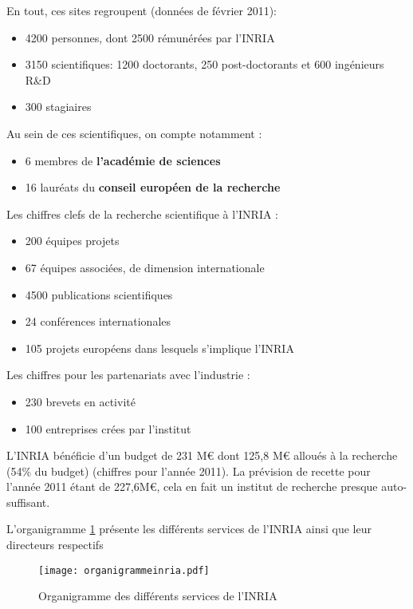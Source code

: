 \documentclass[a4paper, 11pt]{report}
\begin{document}
    En tout, ces sites regroupent (données de février 2011):
    \begin{itemize}
      \item 4200 personnes, dont 2500 rémunérées par l'INRIA
      \item 3150 scientifiques: 1200 doctorants, 250 post-doctorants et 600
        ingénieurs R\&D
      \item 300 stagiaires
    \end{itemize}
    Au sein de ces scientifiques, on compte notamment :
    \begin{itemize}
      \item 6 membres de \textbf{l'académie de sciences}
      \item 16 lauréats du \textbf{conseil européen de la recherche}
    \end{itemize}

    Les chiffres clefs de la recherche scientifique à l'INRIA :
    \begin{itemize}
      \item 200 équipes projets
      \item 67 équipes associées, de dimension internationale
      \item 4500 publications scientifiques
      \item 24 conférences internationales
      \item 105 projets européens dans lesquels s'implique l'INRIA
    \end{itemize}

    Les chiffres pour les partenariats avec l'industrie :
    \begin{itemize}
      \item 230 brevets en activité
      \item 100 entreprises crées par l'institut
    \end{itemize}

    L'INRIA bénéficie d'un budget de 231 M\euro{} dont 125,8 M\euro{} alloués à la
    recherche (54\% du budget) (chiffres pour l'année 2011). La prévision
    de recette pour l'année 2011 étant de 227,6M\euro{}, cela en fait un institut
    de recherche presque auto-suffisant.

    L'organigramme \ref{orga} présente les différents services de l'INRIA ainsi
    que leur directeurs respectifs
    \begin{figure}
    \texttt{[image: organigrammeinria.pdf]}
    \caption{Organigramme des différents services de l'INRIA}
    \label{orga}
    \end{figure}
\end{document}

